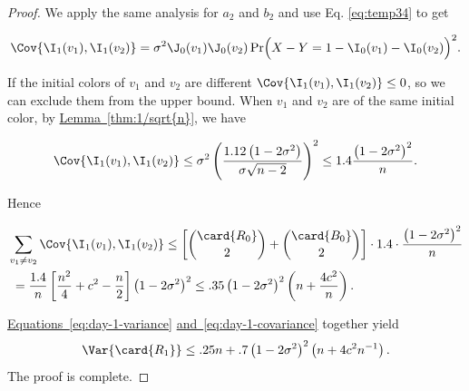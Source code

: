 \documentclass[11pt]{article}
\numberwithin{equation}{section}
\theoremstyle{definition}
\theoremstyle{plain}
\newcommand{\expref}[2]{\hyperref[#2]{#1~\ref{#2}}}
\newcommand{\expeqref}[2]{\hyperref[#2]{#1~\eqref{#2}}}
\begin{document}
\begin{proof}
				\noindent We apply the same analysis for $a_2$ and $b_2$ and use Eq. \eqref{eq:temp34} to get
				\begin{linenomath}\begin{equation*}
						\Cov{\I_1(v_1), \I_1(v_2)} = \sigma^2 \J_0(v_1)\J_0(v_2) \Pr\Bigl(X - Y = 1 - \I_0(v_1) - \I_0(v_2)\Bigr)^2.
				\end{equation*}\end{linenomath}
				If the initial colors of $v_1$ and $v_2$ %
				are %
				different  %
				$\Cov{\I_1(v_1), \I_1(v_2)} \le  0$,
				so we can exclude them from the upper bound.
				When $v_1$ and $v_2$ are of the same initial color, by \expref{Lemma}{thm:1/sqrt{n}}, we have
				\begin{linenomath}\begin{equation*}
						\Cov{\I_1(v_1), \I_1(v_2)} \le \sigma^2 \left(\frac{1.12\left(1 - 2\sigma^2\right)}{\sigma\sqrt{n - 2}}\right)^2
						\le 1.4\frac{\left(1 - 2\sigma^2\right)^2}{n}.
				\end{equation*}\end{linenomath}
				Hence
				\begin{linenomath}\begin{equation*} \label{eq:day-1-covariance}
						\begin{aligned}
							& \sum_{v_1\neq v_2} \Cov{\I_1(v_1), \I_1(v_2)}
							\le \left[\binom{\card{R_0}}{2} + \binom{\card{B_0}}{2}\right]
							\cdot 1.4\cdot \frac{\left(1 - 2\sigma^2\right)^2}{n} \\
							& \ = \frac{1.4}{n} \left[\frac{n^2}{4} + c^2 - \frac{n}{2}\right] \left(1 - 2\sigma^2\right)^2
							\le .35\left(1 - 2\sigma^2\right)^2 \left(n + \frac{4c^2}{n}\right).
						\end{aligned}
				\end{equation*}\end{linenomath}
				\expeqref{Equations}{eq:day-1-variance} \expeqref{and}{eq:day-1-covariance} together yield
				\begin{equation} \label{eq:variance-bound}
					\Var{\card{R_1}} \le .25n + .7\left(1 - 2\sigma^2\right)^2 \left(n + 4c^2n^{-1}\right).
				\end{equation}
				The proof is complete.
			\end{proof}
			
\end{document}
